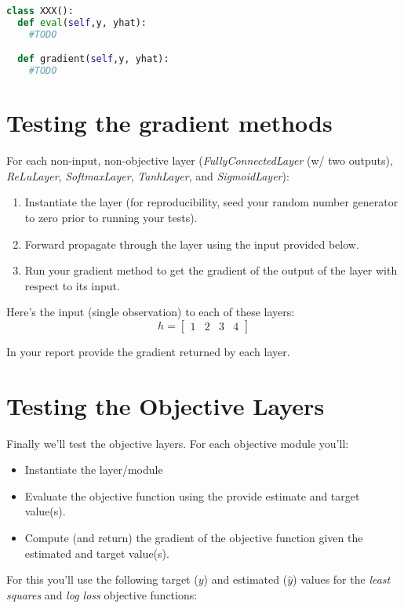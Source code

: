 \documentclass[12pt]{article}
\begin{document}
\begin{lstlisting}[language=Python]
class XXX():
  def eval(self,y, yhat):
    #TODO

  def gradient(self,y, yhat):
    #TODO
\end{lstlisting}

\newpage
\section{Testing the gradient methods}
For each non-input, non-objective layer (\emph{FullyConnectedLayer} (w/ two outputs), \emph{ReLuLayer}, \emph{SoftmaxLayer}, \emph{TanhLayer}, and \emph{SigmoidLayer}):
\begin{enumerate}
\item Instantiate the layer (for reproducibility, seed your random number generator to zero prior to running your tests).
\item Forward propagate through the layer using the input provided below.
\item Run your gradient method to get the gradient of the output of the layer with respect to its input.
\end{enumerate}

\noindent
Here's the input (single observation) to each of these layers:
$$h = \begin{bmatrix}
1 & 2 & 3 & 4
\end{bmatrix}$$

\noindent
In your report provide the gradient returned by each layer.

\newpage
\section{Testing the Objective Layers}
Finally we'll test the objective layers.  For each objective module you'll:

\begin{itemize}
\item Instantiate the layer/module
\item Evaluate the objective function using the provide estimate and target value(s).
\item Compute (and return) the gradient of the objective function given the estimated and target value(s).
\end{itemize}

\noindent
For this you'll use the following target ($y$) and estimated ($\hat{y}$) values for the \emph{least squares} and \emph{log loss} objective functions:
\end{document}
